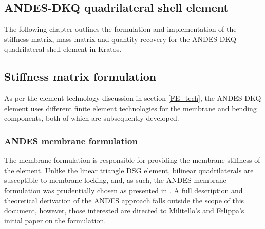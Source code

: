 




\setcounter{MaxMatrixCols}{20}

\begin{flushleft}
	\chapter{ANDES-DKQ quadrilateral shell element}
\end{flushleft}
\renewcommand{\Thema}{ANDES-DKT quadrilateral shell element}

The following chapter outlines the formulation and implementation of the stiffness matrix, mass matrix and quantity recovery for the ANDES-DKQ quadrilateral shell element in Kratos.

\section{Stiffness matrix formulation}

As per the element technology discussion in section \ref{FE_tech}, the ANDES-DKQ element uses different finite element technologies for the membrane and bending components, both of which are subsequently developed. 

\subsection{ANDES membrane formulation}

The membrane formulation is responsible for providing the membrane stiffness of the element. Unlike the linear triangle DSG element, bilinear quadrilaterals are susceptible to membrane locking, and, as such, the ANDES membrane formulation was prudentially chosen as presented in \cite{Hau94}. A full description and theoretical derivation of the ANDES approach falls outside the scope of this document, however, those interested are directed to Militello's and Felippa's initial paper \cite{Fel91} on the formulation.

